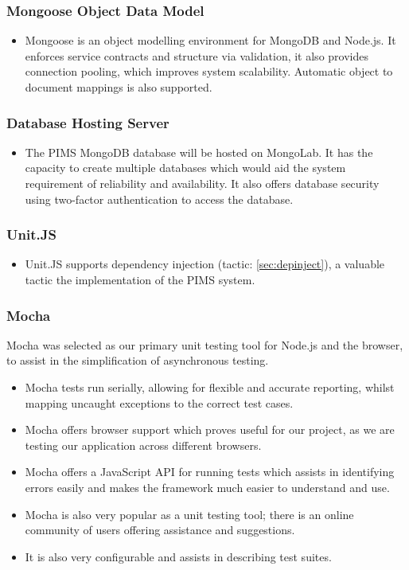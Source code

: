 \subsubsection{Mongoose Object Data Model}
\begin{itemize}
	\item Mongoose is an object modelling environment for MongoDB and Node.js. It enforces service contracts and structure via validation, it also provides connection pooling, which improves system scalability. Automatic object to document mappings is also supported.
\end{itemize}

\subsubsection{Database Hosting Server}
\begin{itemize}
	\item The PIMS MongoDB database will be hosted on MongoLab. It has the capacity to create multiple databases which would aid the system requirement of reliability and availability. It also offers database security using two-factor authentication to access the database.
\end{itemize}

\subsubsection{Unit.JS}
\begin{itemize}
	\item Unit.JS supports dependency injection (tactic: \ref{sec:depinject}), a valuable tactic the implementation of the PIMS system.
\end{itemize}



\subsubsection{Mocha}
Mocha was selected as our primary unit testing tool for Node.js and the browser, to assist in the simplification of asynchronous testing.
\begin{itemize}
	\item Mocha tests run serially, allowing for flexible and accurate reporting, whilst mapping uncaught exceptions to the correct test cases. 
	\item Mocha offers browser support which proves useful for our project, as we are testing our application across different browsers.
	\item Mocha offers a JavaScript API for running tests which assists in identifying errors easily and makes the framework much easier to understand and use.
	\item Mocha is also very popular as a unit testing tool; there is an online community of users offering assistance and suggestions.
	\item It is also very configurable  and assists in describing test suites.
\end{itemize}

